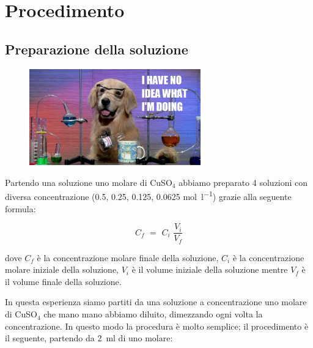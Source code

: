 \vspace{-0.5cm}

\section{Procedimento}

\subsection{Preparazione della soluzione}

\begin{figure}
    \vspace{-15mm}
    \begin{center}
        \includegraphics[width=74mm]{chem_dog.pdf}
    \end{center}
    \vspace{-5mm}
\end{figure}

Partendo una soluzione uno molare di CuSO$_4$ abbiamo preparato 4 soluzioni con diversa concentrazione (0.5, 0.25, 0.125, 0.0625 \si{\mol\per\litre}) grazie alla seguente formula:

\begin{equation}
	C_f \,\, = \,\, C_i \,\, \frac{V_i}{V_f}
	\label{eq:proporzione}
\end{equation}

dove $C_f$ è la concentrazione molare finale della soluzione, $C_i$ è la concentrazione molare iniziale della soluzione, $V_i$ è il volume iniziale della soluzione mentre $V_f$ è il volume finale della soluzione.

In questa esperienza siamo partiti da una soluzione a concentrazione uno molare di CuSO$_4$ che mano mano abbiamo diluito,
dimezzando ogni volta la concentrazione. In questo modo la procedura è molto semplice;
il procedimento è il seguente, partendo da \SI{2}{\milli\litre} di uno molare:


